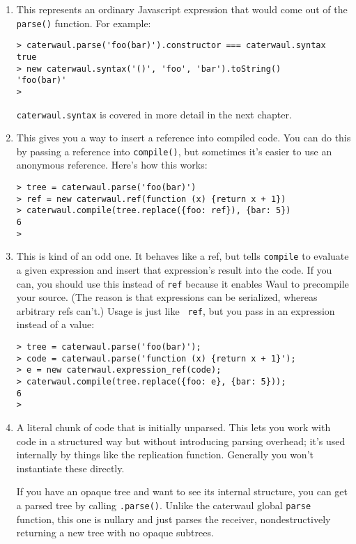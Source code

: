 \documentclass{report}
\begin{document}
\begin{enumerate}
\item[{\tt caterwaul.syntax}]
  This represents an ordinary Javascript expression that would come out of the {\tt parse()} function. For example:

\begin{verbatim}
> caterwaul.parse('foo(bar)').constructor === caterwaul.syntax
true
> new caterwaul.syntax('()', 'foo', 'bar').toString()
'foo(bar)'
>
\end{verbatim}

  {\tt caterwaul.syntax} is covered in more detail in the next chapter.

\item[{\tt caterwaul.ref}]
  This gives you a way to insert a reference into compiled code. You can do this by passing a reference into {\tt compile()}, but sometimes it's easier to use an anonymous reference.
  Here's how this works:

\begin{verbatim}
> tree = caterwaul.parse('foo(bar)')
> ref = new caterwaul.ref(function (x) {return x + 1})
> caterwaul.compile(tree.replace({foo: ref}), {bar: 5})
6
>
\end{verbatim}

\item[{\tt caterwaul.expression\_ref}]
  This is kind of an odd one. It behaves like a ref, but tells {\tt compile} to evaluate a given expression and insert that expression's result into the code. If you can, you should use
  this instead of {\tt ref} because it enables Waul to precompile your source. (The reason is that expressions can be serialized, whereas arbitrary refs can't.) Usage is just like {\tt
  ref}, but you pass in an expression instead of a value:

\begin{verbatim}
> tree = caterwaul.parse('foo(bar)');
> code = caterwaul.parse('function (x) {return x + 1}');
> e = new caterwaul.expression_ref(code);
> caterwaul.compile(tree.replace({foo: e}, {bar: 5}));
6
>
\end{verbatim}

\item[{\tt caterwaul.opaque\_tree}]
  A literal chunk of code that is initially unparsed. This lets you work with code in a structured way but without introducing parsing overhead; it's used internally by things like the
  replication function. Generally you won't instantiate these directly.

  If you have an opaque tree and want to see its internal structure, you can get a parsed tree by calling {\tt .parse()}. Unlike the caterwaul global {\tt parse} function, this one is
  nullary and just parses the receiver, nondestructively returning a new tree with no opaque subtrees.
\end{enumerate}
\end{document}

